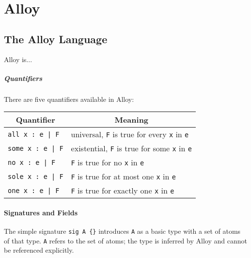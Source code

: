 \chapter{Alloy}\label{ch:Alloy}

\section{The Alloy Language}

    Alloy is...

\paragraph{Quantifiers}

        There are five quantifiers available in Alloy:

        \begin{center}
        \begin{singlespacing}
        \begin{tabular}{|l|l|} \hline
        \multicolumn{1}{|c|}{Quantifier} & \multicolumn{1}{c|}{Meaning} \\ \hline
        \texttt{all x :~e | F} & universal, \texttt{F} is true for every \texttt{x} in \texttt{e} \\
        \texttt{some x :~e | F} & existential, \texttt{F} is true for some \texttt{x} in \texttt{e} \\
        \texttt{no x :~e | F} & \texttt{F} is true for no \texttt{x} in \texttt{e} \\
        \texttt{sole x :~e | F} & \texttt{F} is true for at most one \texttt{x} in \texttt{e} \\
        \texttt{one x :~e | F} & \texttt{F} is true for exactly one \texttt{x} in \texttt{e} \\ \hline
        \end{tabular}
        \end{singlespacing}
        \end{center}


\subsubsection{Signatures and Fields}

        The simple signature \verb|sig A {}| introduces \texttt{A} as a basic type with a set
        of atoms of that type.  \texttt{A} refers to the set of atoms; the type is inferred
        by Alloy and cannot be referenced explicitly.

